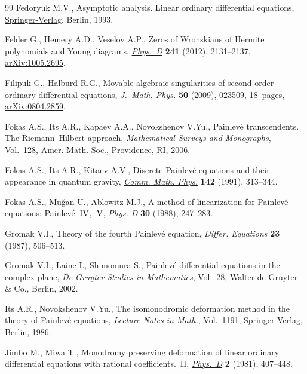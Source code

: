 \documentclass[pdftex]{sigma}
\numberwithin{equation}{section}
\begin{document}
\begin{thebibliography}{99}
Fedoryuk M.V., Asymptotic analysis. Linear ordinary dif\/ferential equations,
 \href{https://doi.org/10.1007/978-3-642-58016-1}{Springer-Verlag}, Berlin, 1993.

 Felder G., Hemery A.D., Veselov A.P.,
 Zeros of {W}ronskians of {H}ermite polynomials and {Y}oung diagrams,
 \href{https://doi.org/10.1016/j.physd.2012.08.008}{\textit{Phys.~D}} \textbf{241}  (2012), 2131--2137,
 \href{https://arxiv.org/abs/1005.2695}{arXiv:1005.2695}.

Filipuk G., Halburd R.G., Movable algebraic singularities of second-order
 ordinary dif\/ferential equations, \href{https://doi.org/10.1063/1.3068414}{\textit{J.~Math. Phys.}} \textbf{50} (2009),
 023509, 18~pages, \href{https://arxiv.org/abs/0804.2859}{arXiv:0804.2859}.

Fokas A.S., Its A.R., Kapaev A.A., Novokshenov V.Yu., Painlev\'e transcendents.
 {T}he {R}iemann--{H}ilbert approach, \href{https://doi.org/10.1090/surv/128}{\textit{Mathematical Surveys and
 Monographs}}, Vol.~128, Amer. Math. Soc., Providence, RI, 2006.

Fokas A.S., Its A.R., Kitaev A.V., Discrete {P}ainlev\'e equations and their
 appearance in quantum gravity, \href{https://doi.org/10.1007/BF02102066}{\textit{Comm. Math. Phys.}} \textbf{142}
 (1991), 313--344.

Fokas A.S., Mu\u{g}an U., Ablowitz M.J., A method of linearization for
 {P}ainlev\'e equations: {P}ainlev\'e~{${\rm IV}$},~{${\rm V}$}, \href{https://doi.org/10.1016/0167-2789(88)90021-8}{\textit{Phys.
 D}} \textbf{30} (1988), 247--283.

Gromak V.I., Theory of the fourth Painlev\'e equation, \textit{Differ.
 Equations} \textbf{23} (1987), 506--513.

Gromak V.I., Laine I., Shimomura S., Painlev\'e dif\/ferential equations in the
 complex plane, \href{https://doi.org/10.1515/9783110198096}{\textit{De Gruyter Studies in Mathematics}}, Vol.~28, Walter de
 Gruyter \& Co., Berlin, 2002.

Its A.R., Novokshenov V.Yu., The isomonodromic deformation method in the theory
 of {P}ainlev\'e equations, \href{https://doi.org/10.1007/BFb0076661}{\textit{Lecture Notes in Math.}}, Vol.~1191,
 Springer-Verlag, Berlin, 1986.

Jimbo M., Miwa T., Monodromy preserving deformation of linear ordinary
 dif\/ferential equations with rational coef\/f\/icients.~{II}, \href{https://doi.org/10.1016/0167-2789(81)90021-X}{\textit{Phys.~D}}
 \textbf{2} (1981), 407--448.


\end{thebibliography}
\end{document}
